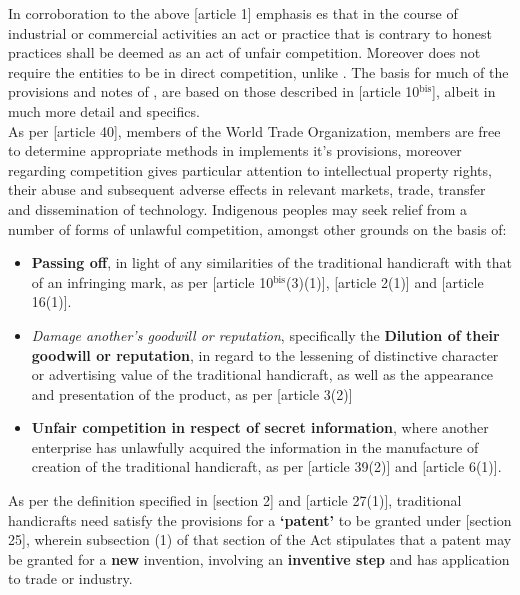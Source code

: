 \documentclass[11pt]{article}
\begin{document}
In corroboration to the above [article 1]\cite{wipo96_model_provi_unfair_comp}
emphasis es that in the course of industrial or commercial activities an act or
practice that is contrary to honest practices shall be deemed as an act of
unfair competition. Moreover \cite{wipo96_model_provi_unfair_comp} does not
require the entities to be in direct competition, unlike
\cite{wipo83_paris_conve_protect_ip}. The basis for much of the provisions and
notes of , are based on those
described in [article 10\(^{\text{bis}}\)]\cite{wipo83_paris_conve_protect_ip}, albeit in much
more detail and specifics.\\

As per [article 40]\cite{wto17_trips}, members of the World Trade Organization,
members are free to determine appropriate methods in implements it's provisions,
moreover regarding competition \cite{wto17_trips} gives particular attention to
intellectual property rights, their abuse and subsequent adverse effects in
relevant markets, trade, transfer and dissemination of technology. Indigenous
peoples may seek relief from a number of forms of unlawful competition, amongst
other grounds on the basis of:
\begin{itemize}
\item \textbf{Passing off}, in light of any similarities of the traditional handicraft with
that of an infringing mark, as per [article
10\(^{\text{bis}}\)(3)(1)]\cite{wipo83_paris_conve_protect_ip}, [article
2(1)]\cite{wipo96_model_provi_unfair_comp} and [article 16(1)]\cite{wto17_trips}.
\item \emph{Damage another's goodwill or reputation}, specifically the \textbf{Dilution of their
goodwill or reputation}, in regard to the lessening of distinctive character
or advertising value of the traditional handicraft, as well as the appearance
and presentation of the product, as per [article
3(2)]\cite{wipo96_model_provi_unfair_comp}
\item \textbf{Unfair competition in respect of secret information}, where another
enterprise has unlawfully acquired the information in the manufacture of
creation of the traditional handicraft, as per [article 39(2)]\cite{wto17_trips}
and [article 6(1)]\cite{wipo96_model_provi_unfair_comp}.
\end{itemize}

As per the definition specified in [section 2]\cite{rsa78_patents_act} and
[article 27(1)]\cite{wto17_trips}, traditional handicrafts need satisfy the provisions for a \textbf{`patent'} to be granted under [section 25]\cite{rsa78_patents_act}, wherein subsection (1) of that section of the Act stipulates that a patent may be granted for a \textbf{new} invention, involving an \textbf{inventive step} and has application to trade or industry.\\
\end{document}
